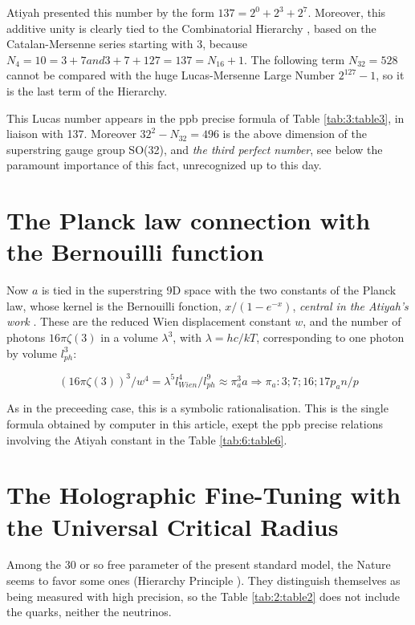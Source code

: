 \documentclass[a4paper,9pt]{article}
\begin{document}
Atiyah presented this number by the form $137 = 2^0 + 2^3 + 2^7$. Moreover, this additive unity is clearly tied to the Combinatorial Hierarchy \cite{Bastin}, based on the Catalan-Mersenne series starting with 3, because $N_4 = 10 = 3 + 7 and 3+7 + 127 = 137 = N_{16} + 1$. The following term $N_{32}  = 528$ cannot be compared with the huge Lucas-Mersenne Large Number $2^{127}- 1$, so it is the last term of the Hierarchy. 

This Lucas number appears in the ppb precise formula of Table \ref{tab:3:table3}, in liaison with 137. Moreover $32^2 - N_{32} =  496$ is the above dimension of the superstring gauge group SO(32), and \textit {the third perfect number}, see below the paramount importance of this fact, unrecognized up to this day.




\section{The Planck law connection with the Bernouilli function}

Now $a$ is tied in the superstring 9D space with the two constants of the Planck law, whose kernel is the Bernouilli fonction, $x/(1-e^{-x})$, \textit {central in the Atiyah's work} \cite{Atiyah}. These are the reduced Wien displacement constant $w$, and the number of photons $16\pi \zeta(3)$ in a volume $\lambda^3$, with $\lambda = hc/kT $, corresponding to one photon by volume $l_{ph}^3$:

\begin{equation}
(16\pi\zeta(3))^3/w^4 = \lambda^5l_{Wien}^4/l_{ph}^9 \approx \pi_a^3a    \Rightarrow     \pi_a: 3;7;16;17p_an/p
\end{equation}

As in the preceeding case, this is a symbolic rationalisation. This is the single formula obtained by computer in this article, exept the ppb precise relations involving the Atiyah constant in the Table \ref{tab:6:table6}.


\section{The Holographic Fine-Tuning with the Universal Critical Radius}

Among the 30 or so free parameter of the present standard model, the Nature seems to favor some ones (Hierarchy Principle \cite{Sanchez}). They distinguish themselves as being measured with high precision, so the Table \ref{tab:2:table2} does not include the quarks, neither the neutrinos. 
\end{document}
